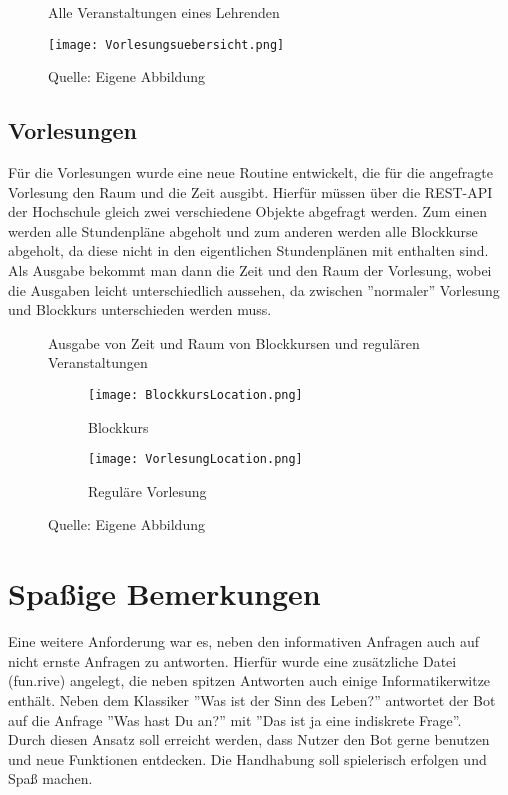 \begin{figure}[!htb]
    \centering
    \caption{Alle Veranstaltungen eines Lehrenden}
      \texttt{[image: Vorlesungsuebersicht.png]}
      \label{img:vorlesungsuebersicht}
    \caption*{Quelle: Eigene Abbildung}
\end{figure}

\subsection{Vorlesungen}
Für die Vorlesungen wurde eine neue Routine entwickelt, die für die angefragte Vorlesung den Raum und die Zeit ausgibt. Hierfür müssen über die REST-API der Hochschule gleich zwei verschiedene Objekte abgefragt werden. Zum einen werden alle Stundenpläne abgeholt und zum anderen werden alle Blockkurse abgeholt, da diese nicht in den eigentlichen Stundenplänen mit enthalten sind. Als Ausgabe bekommt man dann die Zeit und den Raum der Vorlesung, wobei die Ausgaben leicht unterschiedlich aussehen, da zwischen ''normaler'' Vorlesung und Blockkurs unterschieden werden muss.

\begin{figure}[!htb]
    \centering
    \caption{Ausgabe von Zeit und Raum von Blockkursen und regulären Veranstaltungen}
    \begin{subfigure}{.5\textwidth}
        \centering
        \caption{Blockkurs}
          \texttt{[image: BlockkursLocation.png]}
          \label{img:blockkurs}
    \end{subfigure}%
    \begin{subfigure}{.5\textwidth}
        \centering
        \caption{Reguläre Vorlesung}
          \texttt{[image: VorlesungLocation.png]}
          \label{img:vorlesung}
    \end{subfigure}
    \caption*{Quelle: Eigene Abbildung}
    \label{fig:blockkursUndVorlesung}
    \end{figure}

\section{Spaßige Bemerkungen}
Eine weitere Anforderung war es, neben den informativen Anfragen auch auf nicht ernste Anfragen zu antworten. Hierfür wurde eine zusätzliche Datei (fun.rive) angelegt, die neben spitzen Antworten auch einige Informatikerwitze enthält. Neben dem Klassiker ''Was ist der Sinn des Leben?'' antwortet der Bot auf die Anfrage ''Was hast Du an?'' mit ''Das ist ja eine indiskrete Frage''. \\
Durch diesen Ansatz soll erreicht werden, dass Nutzer den Bot gerne benutzen und neue Funktionen entdecken. Die Handhabung soll spielerisch erfolgen und Spaß machen.


